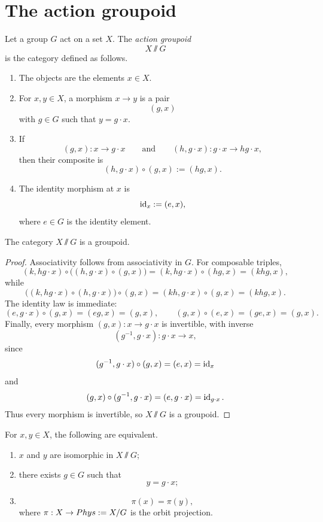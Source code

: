 \section{The action groupoid}
\begin{definition}
	\label{def:action-gpd}
	Let a group \(G\) act on a set \(X\).  The \emph{action groupoid}
	\[
		X\sslash G
	\]
	is the category defined as follows.
	\begin{enumerate}[label=\textup{(\arabic*)}]
		\item The objects are the elements \(x\in X\).
		\item For \(x,y\in X\), a morphism \(x\to y\) is a pair
		      \[
			      (g,x)
		      \]
		      with \(g\in G\) such that \(y=g\cdot x\).
		\item If
		      \[
			      (g,x):x\to g\cdot x
			      \qquad\text{and}\qquad
			      (h,g\cdot x):g\cdot x\to hg\cdot x,
		      \]
		      then their composite is
		      \[
			      (h,g\cdot x)\circ(g,x):=(hg,x).
		      \]
		\item The identity morphism at \(x\) is
		      \[
			      \operatorname{id}_x:=(e,x),
		      \]
		      where \(e\in G\) is the identity element.
	\end{enumerate}
\end{definition}
\begin{lemma}
	\label{lem:action-groupoid-groupoid}
	The category \(X\sslash G\) is a groupoid.
\end{lemma}
\begin{proof}
	Associativity follows from associativity in \(G\).  For composable
	triples,
	\[
		(k,hg\cdot x)\circ\bigl((h,g\cdot x)\circ(g,x)\bigr)
		=
		(k,hg\cdot x)\circ(hg,x)
		=
		(khg,x),
	\]
	while
	\[
		\bigl((k,hg\cdot x)\circ(h,g\cdot x)\bigr)\circ(g,x)
		=
		(kh,g\cdot x)\circ(g,x)
		=
		(khg,x).
	\]
	The identity law is immediate:
	\[
		(e,g\cdot x)\circ(g,x)=(eg,x)=(g,x),
		\qquad
		(g,x)\circ(e,x)=(ge,x)=(g,x).
	\]
	Finally, every morphism \((g,x):x\to g\cdot x\) is invertible, with
	inverse
	\[
		(g^{-1},g\cdot x):g\cdot x\to x,
	\]
	since
	\[
		(g^{-1},g\cdot x)\circ(g,x)=(e,x)=\operatorname{id}_x
	\]
	and
	\[
		(g,x)\circ(g^{-1},g\cdot x)=(e,g\cdot x)=\operatorname{id}_{g\cdot x}.
	\]
	Thus every morphism is invertible, so \(X\sslash G\) is a groupoid.
\end{proof}
\begin{lemma}
	\label{lem:gpd-orbits}
	For \(x,y\in X\), the following are equivalent.
	\begin{enumerate}[label=\textup{(\roman*)}]
		\item \(x\) and \(y\) are isomorphic in \(X\sslash G\);
		\item there exists \(g\in G\) such that
		      \[
			      y=g\cdot x;
		      \]
		\item
		      \[
			      \pi(x)=\pi(y),
		      \]
		      where \(\pi:X\to Phys:=X/G\) is the orbit projection.
	\end{enumerate}
\end{lemma}
